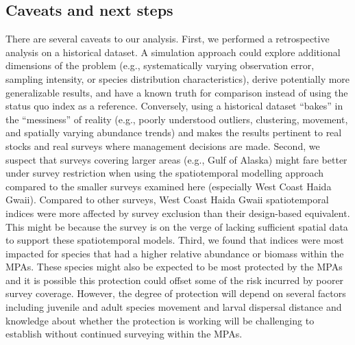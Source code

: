 \documentclass[12pt]{article}
\begin{document}
\subsection*{Caveats and next steps}

There are several caveats to our analysis.
First, we performed a retrospective analysis on a historical dataset.
A simulation approach \citep[e.g.,][]{schnute2003, regular2020} could explore additional dimensions of the problem (e.g., systematically varying observation error, sampling intensity, or species distribution characteristics), derive potentially more generalizable results, and have a known truth for comparison instead of using the status quo index as a reference.
Conversely, using a historical dataset ``bakes'' in the ``messiness'' of reality (e.g., poorly understood outliers, clustering, movement, and spatially varying abundance trends) and makes the results pertinent to real stocks and real surveys where management decisions are made.
Second, we suspect that surveys covering larger areas (e.g., Gulf of Alaska) might fare better under survey restriction when using the spatiotemporal modelling approach compared to the smaller surveys examined here (especially West Coast Haida Gwaii).
Compared to other surveys, West Coast Haida Gwaii spatiotemporal indices were more affected by survey exclusion than their design-based equivalent.
This might be because the survey is on the verge of lacking sufficient spatial data to support these spatiotemporal models.
Third, we found that indices were most impacted for species that had a higher relative abundance or biomass within the MPAs.
These species might also be expected to be most protected by the MPAs and it is possible this protection could offset some of the risk incurred by poorer survey coverage.
However, the degree of protection will depend on several factors including juvenile and adult species movement \citep[e.g.,][]{gerber2003, gruss2011} and larval dispersal distance \citep[e.g.,][]{botsford2003, planes2009} and knowledge about whether the protection is working will be challenging to establish without continued surveying within the MPAs.

\end{document}
